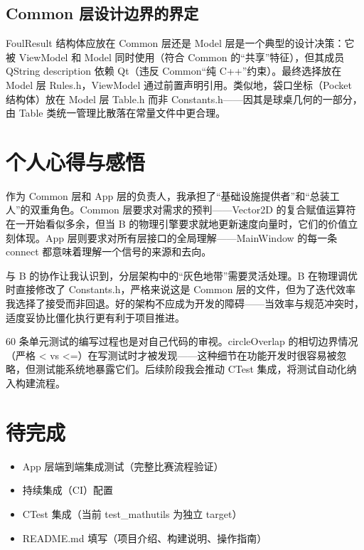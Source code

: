 \documentclass[11pt]{ctexart}
\begin{document}
\subsection{Common 层设计边界的界定}

FoulResult 结构体应放在 Common 层还是 Model 层是一个典型的设计决策：它被 ViewModel 和 Model 同时使用（符合 Common 的“共享”特征），但其成员 QString description 依赖 Qt（违反 Common“纯 C++”约束）。最终选择放在 Model 层 Rules.h，ViewModel 通过前置声明引用。类似地，袋口坐标（Pocket 结构体）放在 Model 层 Table.h 而非 Constants.h——因其是球桌几何的一部分，由 Table 类统一管理比散落在常量文件中更合理。

\section{个人心得与感悟}

作为 Common 层和 App 层的负责人，我承担了“基础设施提供者”和“总装工人”的双重角色。Common 层要求对需求的预判——Vector2D 的复合赋值运算符在一开始看似多余，但当 B 的物理引擎要求就地更新速度向量时，它们的价值立刻体现。App 层则要求对所有层接口的全局理解——MainWindow 的每一条 connect 都意味着理解一个信号的来源和去向。

与 B 的协作让我认识到，分层架构中的“灰色地带”需要灵活处理。B 在物理调优时直接修改了 Constants.h，严格来说这是 Common 层的文件，但为了迭代效率我选择了接受而非回退。好的架构不应成为开发的障碍——当效率与规范冲突时，适度妥协比僵化执行更有利于项目推进。

60 条单元测试的编写过程也是对自己代码的审视。circleOverlap 的相切边界情况（严格 < vs <=）在写测试时才被发现——这种细节在功能开发时很容易被忽略，但测试能系统地暴露它们。后续阶段我会推动 CTest 集成，将测试自动化纳入构建流程。

\section{待完成}

\begin{itemize}
\item App 层端到端集成测试（完整比赛流程验证）
\item 持续集成（CI）配置
\item CTest 集成（当前 test\_mathutils 为独立 target）
\item README.md 填写（项目介绍、构建说明、操作指南）
\end{itemize}
\end{document}
